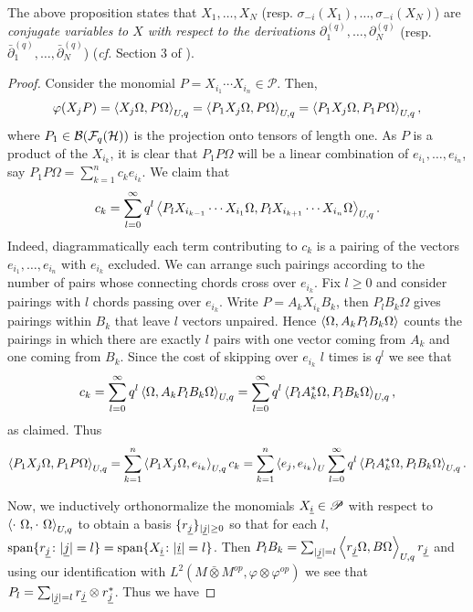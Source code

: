 \begin{rem}
The above proposition states that $X_1,\ldots, X_N$ (resp. $\sigma_{-i}(X_1),\ldots, \sigma_{-i}(X_N)$) are \emph{conjugate variables to $X$ with respect to the derivations $\partial_1^{(q)},\ldots, \partial_N^{(q)}$}  (resp. $\bar{\partial}_1^{(q)},\ldots, \bar{\partial}_N^{(q)}$) (\emph{cf.} Section 3 of \cite{Voi94}).
\end{rem}

\begin{proof}
Consider the monomial $P=X_{i_1}\cdots X_{i_n}\in\mathscr{P}$. Then,
	\begin{align*}
		\varphi(X_j P)=\left\langle X_j\Omega, P\Omega\right\rangle_{U,q} = \left\langle P_1X_j\Omega, P\Omega\right\rangle_{U,q} = \left\langle P_1X_j\Omega, P_1P\Omega\right\rangle_{U,q},
	\end{align*}
where $P_1\in \mathcal B (\mathcal{F}_q(\mathcal H))$ is the projection onto tensors of length one. As $P$ is a product of the $X_{i_k}$, it is clear that $P_1P\Omega$ will be a linear combination of $e_{i_1},\ldots, e_{i_n}$, say $P_1P\Omega=\sum_{k=1}^n c_k e_{i_k}$. We claim that
	\begin{align*}
		c_k =\sum_{l=0}^\infty q^l \left\langle P_l X_{i_{k-1}}\cdots X_{i_1}\Omega, P_l X_{i_{k+1}}\cdots X_{i_n}\Omega\right\rangle_{U,q}.
	\end{align*}
Indeed, diagrammatically each term contributing to $c_k$ is a pairing of the vectors $e_{i_1},\ldots, e_{i_n}$ with $e_{i_k}$ excluded. We can arrange such pairings according to the number of pairs whose connecting chords cross over $e_{i_k}$. Fix $l\geq 0$ and consider pairings with $l$ chords passing over $e_{i_k}$. Write $P=A_kX_{i_k}B_k$, then $P_lB_k\Omega$ gives pairings within $B_k$ that leave $l$ vectors unpaired. Hence $\left\langle\Omega, A_kP_lB_k\Omega\right\rangle$ counts the pairings in which there are exactly $l$ pairs with one vector coming from $A_k$ and one coming from $B_k$. Since the cost of skipping over $e_{i_k}$ $l$ times is $q^l$ we see that
	\begin{equation*}
		c_k = \sum_{l=0}^\infty q^l \left\langle\Omega, A_kP_l B_k\Omega\right\rangle_{U,q} = \sum_{l=0}^\infty q^l \left\langle P_l A_k^*\Omega, P_l B_k\Omega\right\rangle_{U,q},
	\end{equation*}
as claimed. Thus
	\begin{align*}
		\left\langle P_1X_j\Omega, P_1P\Omega\right\rangle_{U,q} =\sum_{k=1}^n \left\langle P_1 X_j\Omega, e_{i_k}\right\rangle_{U,q} c_k = \sum_{k=1}^n \left\langle e_j, e_{i_k}\right\rangle_U  \sum_{l=0}^\infty q^l \left\langle P_l A_k^*\Omega, P_l B_k\Omega\right\rangle_{U,q}.
	\end{align*}\par
Now, we inductively orthonormalize the monomials $X_{\underline{i}}\in\mathscr{P}$ with respect to $\<\cdot\ \Omega,\cdot\ \Omega\>_{U,q}$ to obtain a basis $\{r_{\underline{j}}\}_{|\underline{j}|\geq 0}$ so that for each $l$, $\text{span}\{r_{\underline{j}}\colon |\underline{j}|=l\}=\text{span}\{X_{\underline{i}}\colon |\underline{i}|=l\}$. Then $P_lB_k=\sum_{|\underline{j}|=l} \left\langle r_{\underline{j}}\Omega, B\Omega\right\rangle_{U,q} r_{\underline{j}}$ and using our identification with $L^2(M\bar{\otimes}M^{op},\varphi\otimes\varphi^{op})$ we see that $P_l = \sum_{|\underline{j}|=l} r_{\underline{j}}\otimes r_{\underline{j}}^*$. Thus we have

\end{proof}

